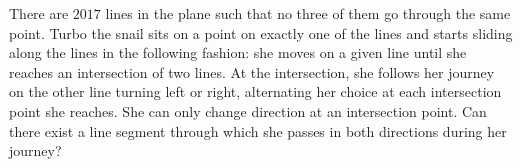 There are $2017$ lines in the plane such that no three of them go through the same point. Turbo the snail sits on a point on exactly one of the lines and starts sliding along the lines in the following fashion: she moves on a given line until she reaches an intersection of two lines. At the intersection, she follows her journey on the other line turning left or right, alternating her choice at each intersection point she reaches. She can only change direction at an intersection point. Can there exist a line segment through which she passes in both directions during her journey?